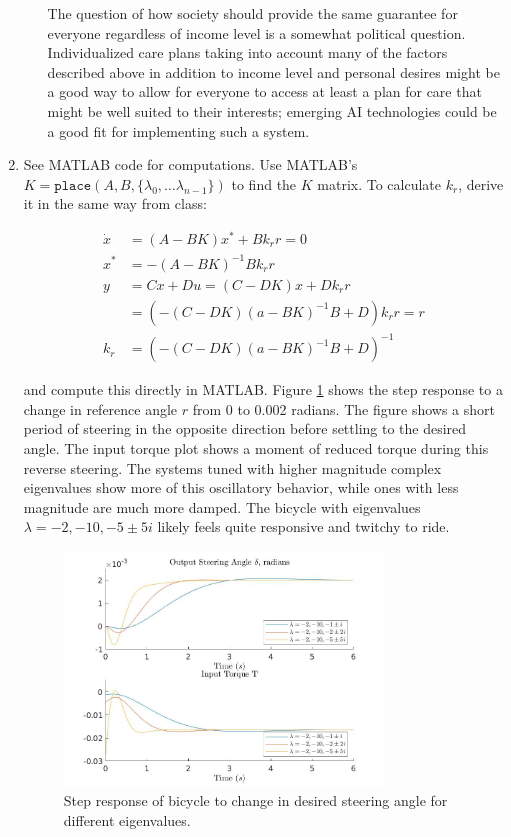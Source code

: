 \documentclass[11pt]{article}
\theoremstyle{definition}
\begin{document}
\begin{enumerate}
\begin{enumerate}
        The question of how society should provide the same guarantee for everyone regardless of income level is a somewhat political question.  Individualized care plans taking into account many of the factors described above in addition to income level and personal desires might be a good way to allow for everyone to access at least a plan for care that might be well suited to their interests; emerging AI technologies could be a good fit for implementing such a system.

    \end{enumerate}
    \item %

    See MATLAB code for computations.  Use MATLAB's $K = \mathtt{place}(A, B, \{\lambda_0, \ldots \lambda_{n-1}\})$ to find the $K$ matrix. To calculate $k_r$, derive it in the same way from class:

    \begin{align*}
        \dot{x} &= (A - BK)x^* + Bk_rr = 0 \\
        x^* &= -(A-BK)^{-1}Bk_rr \\
        y &= Cx + Du = (C - DK)x + Dk_rr \\
        &= \left( -(C - DK)(a - BK)^{-1}B + D \right)k_rr = r \\
        k_r &= \left( -(C - DK)(a - BK)^{-1}B + D \right)^{-1}
    \end{align*}

    and compute this directly in MATLAB.  Figure \ref{fig:bikeStepResponse} shows the step response to a change in reference angle $r$ from 0 to 0.002 radians.  The figure shows a short period of steering in the opposite direction before settling to the desired angle.  The input torque plot shows a moment of reduced torque during this reverse steering.  The systems tuned with higher magnitude complex eigenvalues show more of this oscillatory behavior, while ones with less magnitude are much more damped.  The bicycle with eigenvalues $\lambda = -2, -10, -5 \pm 5i$ likely feels quite responsive and twitchy to ride.

    \begin{figure}
        \centering
        \includegraphics[width = 0.8\textwidth]{ES155P4_2_bicycleStepResponse.jpg}
        \caption{Step response of bicycle to change in desired steering angle for different eigenvalues.}
        \label{fig:bikeStepResponse}
    \end{figure}

\end{enumerate}
\end{document}
